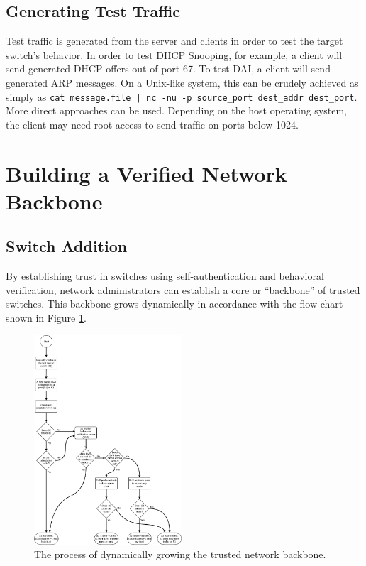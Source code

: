 \documentclass[journal]{IEEEtran}
\begin{document}
\subsection{Generating Test Traffic}
Test traffic is generated from the server and clients in order to test the target switch's behavior.
In order to test DHCP Snooping, for example, a client will send generated DHCP offers out of port
67. To test DAI, a client will send generated ARP messages. On a Unix-like system, this can be
crudely achieved as simply as \texttt{cat message.file | nc -nu -p source\_port dest\_addr
dest\_port}. More direct approaches can be used. Depending on the host operating system, the client
may need root access to send traffic on ports below 1024.


\section{Building a Verified Network Backbone}

\subsection{Switch Addition}
By establishing trust in switches using self-authentication and behavioral verification, network
administrators can establish a core or ``backbone'' of trusted switches. This backbone grows
dynamically in accordance with the flow chart shown in Figure \ref{fig:switch-addition}.

\begin{figure}[htbp]
\centerline{\includegraphics[width=0.49\textwidth]{images/switch-addition}}
\caption{The process of dynamically growing the trusted network backbone.}
\label{fig:switch-addition}
\end{figure}
\end{document}
